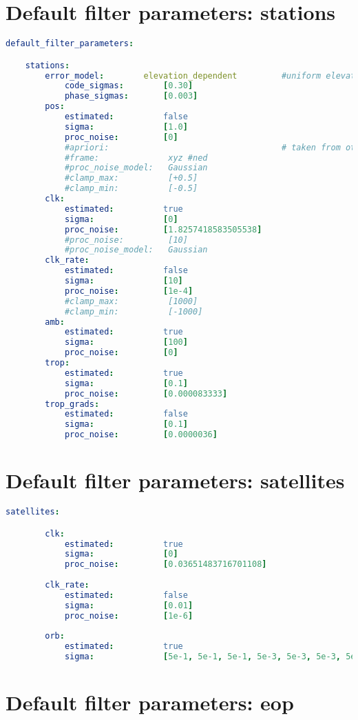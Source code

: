 \section{Default filter parameters: stations}

\begin{lstlisting}[language=yaml,caption=yaml input files configuration example]
default_filter_parameters:

	stations:	
		error_model:        elevation_dependent         #uniform elevation_dependent
			code_sigmas:        [0.30]
			phase_sigmas:       [0.003]
		pos:
			estimated:          false
			sigma:              [1.0]
			proc_noise:         [0]
			#apriori:                                   # taken from other source, rinex file etc.
			#frame:              xyz #ned
			#proc_noise_model:   Gaussian
			#clamp_max:          [+0.5]
			#clamp_min:          [-0.5]
		clk:
			estimated:          true
			sigma:              [0]
			proc_noise:         [1.8257418583505538]
			#proc_noise:         [10]
			#proc_noise_model:   Gaussian
		clk_rate:
			estimated:          false
			sigma:              [10]
			proc_noise:         [1e-4]
			#clamp_max:          [1000]
			#clamp_min:          [-1000]
		amb:
			estimated:          true
			sigma:              [100]
			proc_noise:         [0]
		trop:
			estimated:          true
			sigma:              [0.1]
			proc_noise:         [0.000083333]
		trop_grads:
			estimated:          false
			sigma:              [0.1]
			proc_noise:         [0.0000036]
\end{lstlisting}

\section{Default filter parameters: satellites}

\begin{lstlisting}[language=yaml,caption=yaml input files configuration example]
    satellites:

		clk:
			estimated:          true
			sigma:              [0]
			proc_noise:         [0.03651483716701108]
		
		clk_rate:
			estimated:          false
			sigma:              [0.01]
			proc_noise:         [1e-6]
		
		orb:
			estimated:          true
			sigma:              [5e-1, 5e-1, 5e-1, 5e-3, 5e-3, 5e-3, 5e-1]
\end{lstlisting}

\section{Default filter parameters: eop}


